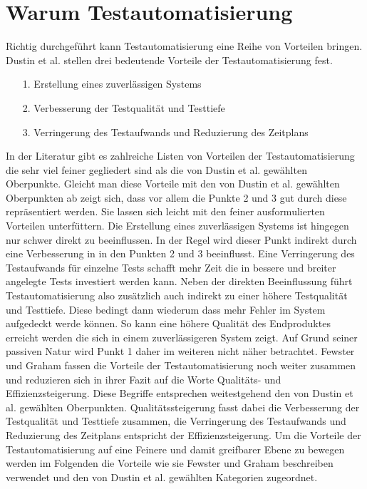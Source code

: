 \section{Warum Testautomatisierung}
\label{sec:warum_testautomatisierung}

Richtig durchgeführt kann Testautomatisierung eine Reihe von Vorteilen bringen. Dustin et al. stellen drei bedeutende Vorteile der Testautomatisierung fest. \cite[S.44 ff.]{dustin_software_2001}
\begin{itemize}
\item[1.] Erstellung eines zuverlässigen Systems
\item[2.] Verbesserung der Testqualität und Testtiefe
\item[3.] Verringerung des Testaufwands und Reduzierung des Zeitplans
\end{itemize}


In der Literatur gibt es zahlreiche Listen von Vorteilen der Testautomatisierung die sehr viel feiner gegliedert sind als die von Dustin et al. gewählten Oberpunkte. \cite{fewster_software_1999} \cite{thaller_software-test_2002}
Gleicht man diese Vorteile mit den von Dustin et al. gewählten Oberpunkten ab zeigt sich, dass vor allem die Punkte 2 und 3 gut durch diese repräsentiert werden. Sie lassen sich leicht mit den feiner ausformulierten Vorteilen unterfüttern. Die Erstellung eines zuverlässigen Systems ist hingegen nur schwer direkt zu beeinflussen. In der Regel wird dieser Punkt indirekt durch eine Verbesserung in in den Punkten 2 und 3 beeinflusst.
Eine Verringerung des Testaufwands für einzelne Tests schafft mehr Zeit die in bessere und breiter angelegte Tests investiert werden kann. Neben der direkten Beeinflussung führt Testautomatisierung also zusätzlich auch indirekt zu einer höhere Testqualität und Testtiefe. Diese bedingt dann wiederum dass mehr Fehler im System aufgedeckt werde können. So kann eine höhere Qualität des Endproduktes erreicht werden die sich in einem zuverlässigeren System zeigt.
Auf Grund seiner passiven Natur wird Punkt 1 daher im weiteren nicht näher betrachtet.
Fewster und Graham fassen die Vorteile der Testautomatisierung noch weiter zusammen und reduzieren sich in ihrer Fazit auf die Worte Qualitäts- und Effizienzsteigerung.
Diese Begriffe entsprechen weitestgehend den von Dustin et al. gewählten Oberpunkten. Qualitätssteigerung fasst dabei die Verbesserung der Testqualität und Testtiefe zusammen, die Verringerung des Testaufwands und Reduzierung des Zeitplans entspricht der Effizienzsteigerung. 
Um die Vorteile der Testautomatisierung auf eine Feinere und damit greifbarer Ebene zu bewegen werden im Folgenden die Vorteile wie sie 
Fewster und Graham beschreiben verwendet und den von Dustin et al. gewählten Kategorien zugeordnet.

